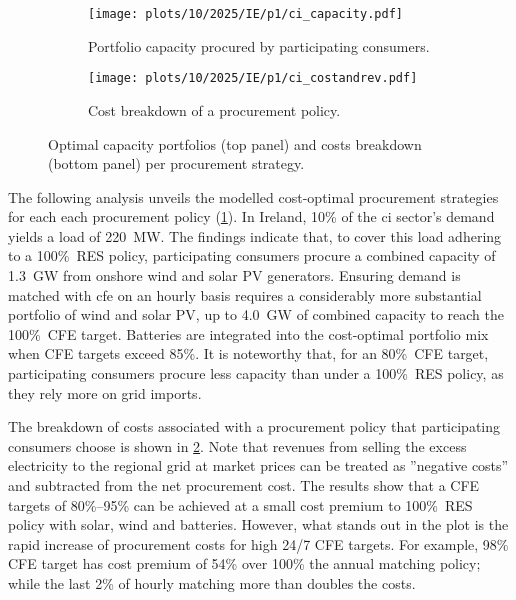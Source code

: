 \begin{figure}[t]
    \centering
    \begin{subfigure}[t]{0.95\columnwidth}
        \centering
        \caption{Portfolio capacity procured by participating consumers.}
        \texttt{[image: plots/10/2025/IE/p1/ci\_capacity.pdf]}
        \label{fig:10-2025-IE-p1-ci_capacity}
    \end{subfigure}
    \begin{subfigure}[t]{0.95\columnwidth}
        \centering
        \vspace{-0.2cm}
        \caption{Cost breakdown of a procurement policy.}
        \texttt{[image: plots/10/2025/IE/p1/ci\_costandrev.pdf]}
        \label{fig:10-2025-IE-p1-ci_costandrev}
    \end{subfigure}
    \caption{Optimal capacity portfolios (top panel) and costs breakdown (bottom panel) per procurement strategy.}
    \label{fig:10-2025-IE-p1-ci_procurement}
\end{figure}

The following analysis unveils the modelled cost-optimal procurement strategies for each each procurement policy (\cref{fig:10-2025-IE-p1-ci_capacity}).
In Ireland, 10\% of the \gls{ci} sector's demand yields a load of 220~MW.
The findings indicate that, to cover this load adhering to a 100\%~RES policy, participating consumers procure a combined capacity of 1.3~GW from onshore wind and solar PV generators.
Ensuring demand is matched with \gls{cfe} on an hourly basis requires a considerably more substantial portfolio of wind and solar PV, up to 4.0~GW of combined capacity to reach the 100\%~CFE target.
Batteries are integrated into the cost-optimal portfolio mix when CFE targets exceed 85\%.
It is noteworthy that, for an 80\%~CFE target, participating consumers procure less capacity than under a 100\%~RES policy, as they rely more on grid imports.

The breakdown of costs associated with a procurement policy that participating consumers choose is shown in \cref{fig:10-2025-IE-p1-ci_costandrev}.
Note that revenues from selling the excess electricity to the regional grid at market prices can be treated as ”negative costs” and subtracted from the net procurement cost.
The results show that a CFE targets of 80\%--95\% can be achieved at a small cost premium to 100\%~RES policy with solar, wind and batteries.
However, what stands out in the plot is the rapid increase of procurement costs for high 24/7 CFE targets. 
For example, 98\% CFE target has cost premium of 54\% over 100\% the annual matching policy; while the last 2\% of hourly matching more than doubles the costs.


